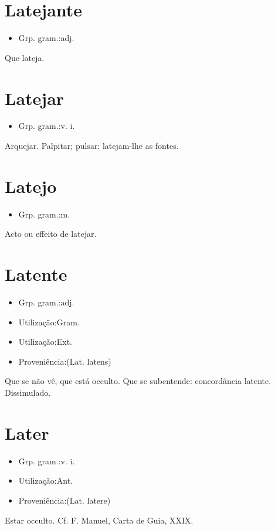 \section{Latejante}
\begin{itemize}
\item {Grp. gram.:adj.}
\end{itemize}
Que lateja.
\section{Latejar}
\begin{itemize}
\item {Grp. gram.:v. i.}
\end{itemize}
Arquejar.
Palpitar; pulsar: \textunderscore latejam-lhe as fontes\textunderscore .
\section{Latejo}
\begin{itemize}
\item {Grp. gram.:m.}
\end{itemize}
Acto ou effeito de latejar.
\section{Latente}
\begin{itemize}
\item {Grp. gram.:adj.}
\end{itemize}
\begin{itemize}
\item {Utilização:Gram.}
\end{itemize}
\begin{itemize}
\item {Utilização:Ext.}
\end{itemize}
\begin{itemize}
\item {Proveniência:(Lat. \textunderscore latens\textunderscore )}
\end{itemize}
Que se não vê, que está occulto.
Que se subentende: \textunderscore concordância latente\textunderscore .
Dissimulado.
\section{Later}
\begin{itemize}
\item {Grp. gram.:v. i.}
\end{itemize}
\begin{itemize}
\item {Utilização:Ant.}
\end{itemize}
\begin{itemize}
\item {Proveniência:(Lat. \textunderscore latere\textunderscore )}
\end{itemize}
Estar occulto. Cf. F. Manuel, \textunderscore Carta de Guia\textunderscore , XXIX.
